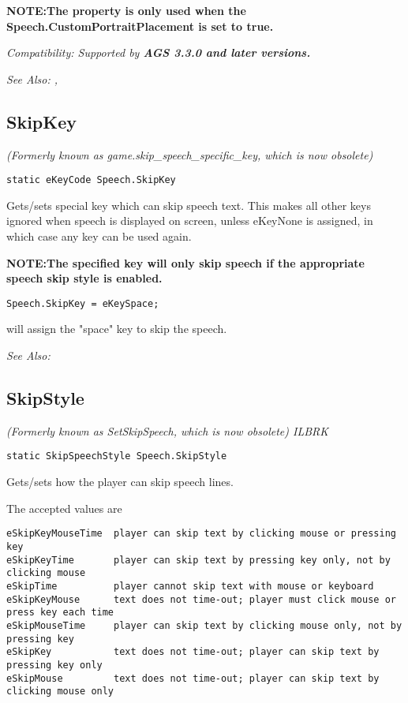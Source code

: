 \bf{NOTE:}The property is only used when the \bf{Speech.CustomPortraitPlacement} is set to \bf{true}.

\it{Compatibility:} Supported by \bf{AGS 3.3.0} and later versions.

\it{See Also:} ,


\subsection{SkipKey}\label{Speech.SkipKey}%

\it{(Formerly known as game.skip_speech_specific_key, which is now obsolete)}

\begin{verbatim}
static eKeyCode Speech.SkipKey
\end{verbatim}

Gets/sets special key which can skip speech text. This makes all other keys ignored when speech is displayed on screen, unless eKeyNone is assigned, in which case any key can be used again.

\bf{NOTE:}The specified key will only skip speech if the appropriate speech skip style is enabled.

\begin{verbatim}
Speech.SkipKey = eKeySpace;
\end{verbatim}
will assign the "space" key to skip the speech.

\it{See Also:} 


\subsection{SkipStyle}\label{Speech.SkipStyle}%

\it{(Formerly known as SetSkipSpeech, which is now obsolete)} ILBRK

\begin{verbatim}
static SkipSpeechStyle Speech.SkipStyle
\end{verbatim}

Gets/sets how the player can skip speech lines.

The accepted values are
\begin{verbatim}
eSkipKeyMouseTime  player can skip text by clicking mouse or pressing key
eSkipKeyTime       player can skip text by pressing key only, not by clicking mouse
eSkipTime          player cannot skip text with mouse or keyboard
eSkipKeyMouse      text does not time-out; player must click mouse or press key each time
eSkipMouseTime     player can skip text by clicking mouse only, not by pressing key
eSkipKey           text does not time-out; player can skip text by pressing key only
eSkipMouse         text does not time-out; player can skip text by clicking mouse only
\end{verbatim}

